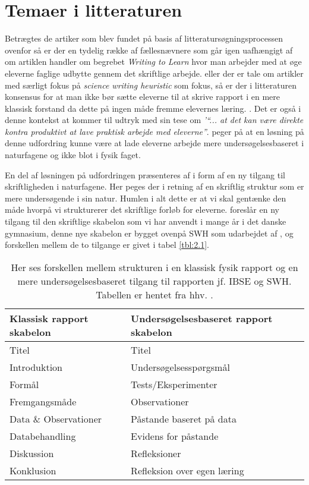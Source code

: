 \section{Temaer i litteraturen}
\label{sec:2.3}

Betrægtes de artiker som blev fundet på basis af litteratursøgningsprocessen ovenfor så er der en tydelig række af fællesnævnere som går igen uafhængigt af om artiklen handler om begrebet \emph{Writing to Learn} hvor man arbejder med at øge eleverne faglige udbytte gennem det skriftlige arbejde. eller der er tale om artikler med særligt fokus på \emph{science writing heuristic} som fokus, så er der i litteraturen konsensus for at man ikke bør sætte eleverne til at skrive rapport i en mere klassisk forstand da dette på ingen måde fremme elevernes læring. \citep{Akkus2007, Atasoy2013, Burke2005, Keys1999}. Det er også i denne kontekst at \citet{Hodson2008} kommer til udtryk med sin tese om \emph{'``... at det kan være direkte kontra produktivt at lave praktisk arbejde med eleverne''}. \citet{Krogh2016,Dolin2014} peger på at en løsning på denne udfordring kunne være at lade eleverne arbejde mere undersøgelsesbaseret i naturfagene og ikke blot i fysik faget. 

En del af løsningen på udfordringen præsenteres af \citep{Keys1999, Burke2005} i form af en ny tilgang til skriftligheden i naturfagene. Her peges der i retning af en skriftlig struktur som er mere undersøgende i sin natur. Humlen i alt dette er at vi skal gentænke den måde hvorpå vi strukturerer det skriftlige forløb for eleverne. \citet{Burke2005} foreslår en ny tilgang til den skriftlige skabelon som vi har anvendt i mange år i det danske gymnasium, denne nye skabelon er bygget ovenpå SWH som udarbejdet af \citep{Keys1999}, og forskellen mellem de to tilgange er givet i tabel \vref{tbl:2.1}.

\begin{table}
	\centering
	\caption{ Her ses forskellen mellem strukturen i en klassisk fysik rapport og en mere undersøgelsesbaseret tilgang til rapporten jf. IBSE og SWH. Tabellen er hentet fra hhv. 
	\citet{Burke2005, Keys1999}.}
	\label{tbl:2.1}
	\begin{tabular}{@{ } l l @{ }}
		\toprule[2.5pt]
			Klassisk rapport  skabelon & Undersøgelsesbaseret rapport skabelon\\
		\midrule[1.25pt]
			Titel				&	Titel\\
			Introduktion			&	Undersøgelsesspørgsmål\\
			Formål			& 	Tests/Eksperimenter\\
			Fremgangsmåde		&	Observationer\\
			Data \& Observationer	&	Påstande baseret på data\\
			Databehandling		&	Evidens for påstande\\
			Diskussion			&	Refleksioner\\
			Konklusion			&	Refleksion over egen læring\\
		\bottomrule[2.5pt]
	\end{tabular}
\end{table}

